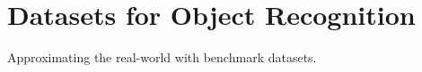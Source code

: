 
\section{Datasets for Object Recognition}
\label{sec:datasets_for_object_recognition}

Approximating the real-world with benchmark datasets. 